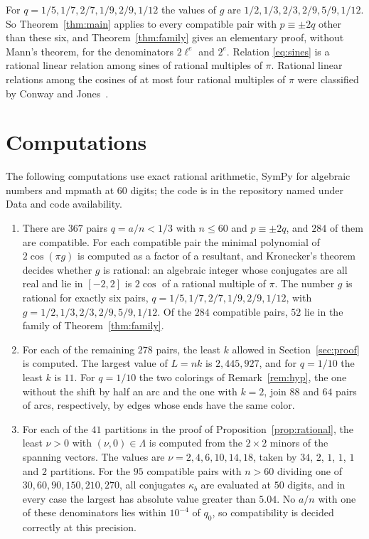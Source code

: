 \documentclass[11pt]{amsart}
\theoremstyle{remark}
\numberwithin{equation}{section}
\begin{document}
For $q=1/5,1/7,2/7,1/9,2/9,1/12$ the values of $g$ are
$1/2,1/3,2/3,2/9,5/9,1/12$. So Theorem~\ref{thm:main} applies to every
compatible pair with $p\equiv\pm2q$ other than these six, and
Theorem~\ref{thm:family} gives an elementary proof, without Mann's
theorem, for the denominators $2\ell^e$ and $2^e$. Relation
\eqref{eq:sines} is a rational linear relation among sines of rational
multiples of $\pi$. Rational linear relations among the cosines of at
most four rational multiples of $\pi$ were classified by Conway and
Jones~\cite{CJ76}.

\section{Computations}\label{sec:comp}

The following computations use exact rational arithmetic, SymPy for
algebraic numbers and mpmath at $60$ digits; the code is in the
repository named under Data and code availability.
\begin{enumerate}
\item There are $367$ pairs $q=a/n<1/3$ with $n\le60$ and
$p\equiv\pm2q$, and $284$ of them are compatible. For each compatible
pair the minimal polynomial of $2\cos(\pi g)$ is computed as a factor of
a resultant, and Kronecker's theorem~\cite{Kro57} decides whether $g$ is
rational: an algebraic integer whose conjugates are all real and lie in
$[-2,2]$ is $2\cos$ of a rational multiple of $\pi$. The number $g$ is
rational for exactly six pairs, $q=1/5,1/7,2/7,1/9,2/9,1/12$, with
$g=1/2,1/3,2/3,2/9,5/9,1/12$. Of the $284$ compatible pairs, $52$ lie in
the family of Theorem~\ref{thm:family}.
\item For each of the remaining $278$ pairs, the least $k$ allowed in
Section~\ref{sec:proof} is computed. The largest value of $L=nk$ is
$2{,}445{,}927$, and for $q=1/10$ the least $k$ is $11$. For $q=1/10$
the two colorings of Remark~\ref{rem:hyp}, the one without the shift by
half an arc and the one with $k=2$, join $88$ and $64$ pairs of arcs,
respectively, by edges whose ends have the same color.
\item For each of the $41$ partitions in the proof of
Proposition~\ref{prop:rational}, the least $\nu>0$ with $(\nu,0)\in\Lambda$
is computed from the $2\times2$ minors of the spanning vectors. The values
are $\nu=2,4,6,10,14,18$, taken by $34$, $2$, $1$, $1$, $1$ and $2$
partitions. For the $95$ compatible pairs with $n>60$ dividing one of
$30,60,90,150,210,270$, all conjugates $\kappa_b$ are evaluated at $50$
digits, and in every case the largest has absolute value greater than
$5.04$. No $a/n$ with one of these denominators lies within $10^{-4}$
of $q_0$, so compatibility is decided correctly at this precision.
\end{enumerate}
\end{document}
